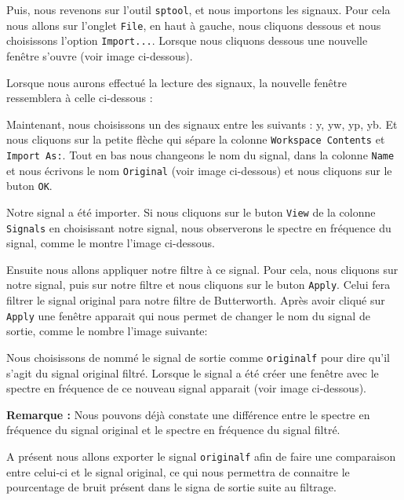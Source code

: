 \documentclass[conference,onecolumn]{IEEEtran}
\begin{document}
Puis, nous revenons sur l'outil \texttt{sptool}, et nous importons les signaux. Pour cela nous allons sur l'onglet \texttt{File}, en haut à gauche, nous cliquons dessous et nous choisissons l'option \texttt{Import...}. Lorsque nous cliquons dessous une nouvelle fenêtre s'ouvre (voir image ci-dessous).


Lorsque nous aurons effectué la lecture des signaux, la nouvelle fenêtre ressemblera à celle ci-dessous :


Maintenant, nous choisissons un des signaux entre les suivants : y, yw, yp, yb. Et nous cliquons sur la petite flèche qui sépare la colonne \texttt{Workspace Contents} et \texttt{Import As:}. Tout en bas nous changeons le nom du signal, dans la colonne \texttt{Name} et nous écrivons le nom \texttt{Original} (voir image ci-dessous) et nous cliquons sur le buton \texttt{OK}.


Notre signal a été importer. Si nous cliquons sur le buton \texttt{View} de la colonne \texttt{Signals} en choisissant notre signal, nous observerons le spectre en fréquence du signal, comme le montre l'image ci-dessous.


Ensuite nous allons appliquer notre filtre à ce signal. Pour cela, nous cliquons sur notre signal, puis sur notre filtre et nous cliquons sur le buton \texttt{Apply}. Celui fera filtrer le signal original para notre filtre de Butterworth. Après avoir cliqué sur \texttt{Apply} une fenêtre apparait qui nous permet de changer le nom du signal de sortie, comme le nombre l'image suivante:


Nous choisissons de nommé le signal de sortie comme \texttt{originalf} pour dire qu'il s'agit du signal original filtré. Lorsque le signal a été créer une fenêtre avec le spectre en fréquence de ce nouveau signal apparait (voir image ci-dessous).


\item \textbf{Remarque :} Nous pouvons déjà constate une différence entre le spectre en fréquence du signal original et le spectre en fréquence du signal filtré.

A présent nous allons exporter le signal \texttt{originalf} afin de faire une comparaison entre celui-ci et le signal original, ce qui nous permettra de connaitre le pourcentage de bruit présent dans le signa de sortie suite au filtrage. 
\end{document}
